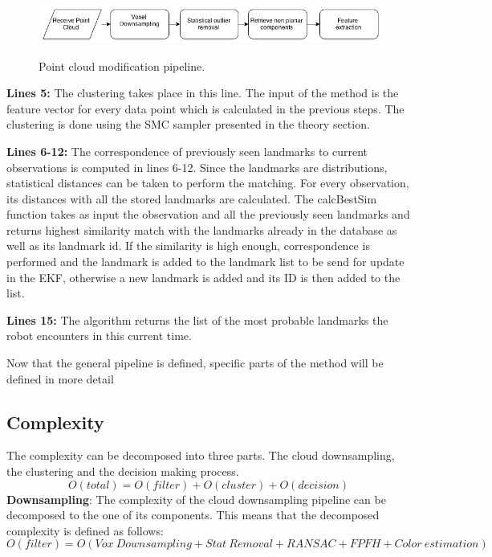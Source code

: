 \documentclass[twoside,hidelinks]{article}
\begin{document}
\begin{figure}[h!]
  \caption{Point cloud modification pipeline.}
  \centering
    \includegraphics[width=1\textwidth]{Basic}
  \label{pcl:mod}
\end{figure}

\textbf{Lines 5:} The clustering takes place in this line. The input of the method is the feature vector for every data point which is calculated in the previous steps. The clustering is done using the SMC sampler presented in the theory section. 

\textbf{Lines 6-12:} The correspondence of previously seen landmarks to current observations is computed in lines 6-12. Since the landmarks are distributions, statistical distances can be taken to perform the matching. For every observation, its distances with all the stored landmarks are calculated. The calcBestSim function takes as input the observation and all the previously seen landmarks and returns highest similarity match with the landmarks already in the database as well as its landmark id. If the similarity is high enough, correspondence is performed and the landmark is added to the landmark list to be send for update in the EKF, otherwise a new landmark is added and its ID is then added to the list.

\textbf{Lines 15:} The algorithm returns the list of the most probable landmarks the robot encounters in this current time.


Now that the general pipeline is defined, specific parts of the method will be defined in more detail

\subsection{Complexity}

The complexity can be decomposed into three parts. The cloud downsampling, the clustering and the decision making process.
$$
O(total) = O(filter) + O(cluster) + O(decision)
$$
\textbf{Downsampling}: The complexity of the cloud downsampling pipeline can be decomposed to the one of its components. This means that the decomposed complexity is defined as follows:
$$O(filter) = O(Vox\ Downsampling + Stat\ Removal + RANSAC+ FPFH + Color\ estimation) $$
\end{document}
